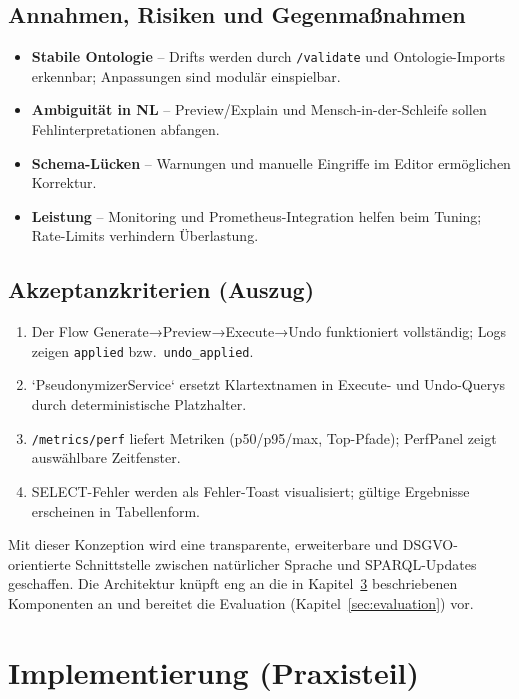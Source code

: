 \section{Annahmen, Risiken und Gegenmaßnahmen}
\begin{itemize}
  \item \textbf{Stabile Ontologie} – Drifts werden durch \texttt{/validate} und Ontologie-Imports erkennbar; Anpassungen sind modulär einspielbar.
  \item \textbf{Ambiguität in NL} – Preview/Explain und Mensch-in-der-Schleife sollen Fehlinterpretationen abfangen.
  \item \textbf{Schema-Lücken} – Warnungen und manuelle Eingriffe im Editor ermöglichen Korrektur.
  \item \textbf{Leistung} – Monitoring und Prometheus-Integration helfen beim Tuning; Rate-Limits verhindern Überlastung.
\end{itemize}

\section{Akzeptanzkriterien (Auszug)}
\begin{enumerate}
  \item Der Flow Generate→Preview→Execute→Undo funktioniert vollständig; Logs zeigen \texttt{applied} bzw.\ \texttt{undo\_applied}.
  \item `PseudonymizerService` ersetzt Klartextnamen in Execute- und Undo-Querys durch deterministische Platzhalter.
  \item \texttt{/metrics/perf} liefert Metriken (p50/p95/max, Top-Pfade); PerfPanel zeigt auswählbare Zeitfenster.
  \item SELECT-Fehler werden als Fehler-Toast visualisiert; gültige Ergebnisse erscheinen in Tabellenform.
\end{enumerate}

\medskip
Mit dieser Konzeption wird eine transparente, erweiterbare und DSGVO-orientierte Schnittstelle zwischen natürlicher Sprache und SPARQL-Updates geschaffen. Die Architektur knüpft eng an die in Kapitel~\ref{sec:implementierung} beschriebenen Komponenten an und bereitet die Evaluation (Kapitel~\ref{sec:evaluation}) vor.





\chapter{Implementierung (Praxisteil)}
\label{sec:implementierung}

